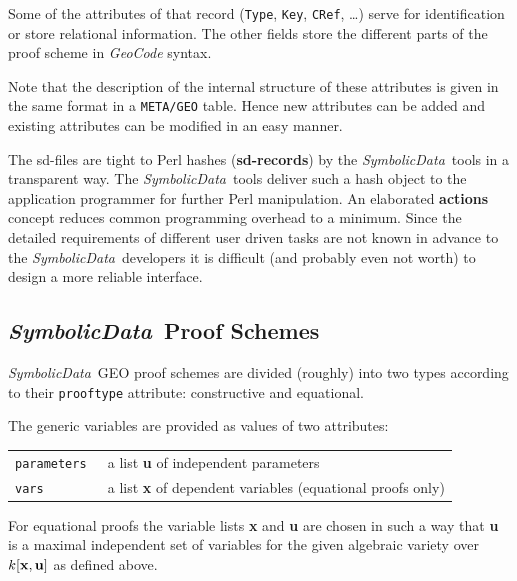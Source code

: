 \documentclass[11pt]{article}
\newcommand{\GC}{\textit{Geo\-Code}}
\newcommand{\SD}{\textit{Symbolic\-Data}}
\begin{document}
Some of the attributes of that record ({\tt Type}, {\tt Key}, {\tt CRef},
\ldots) serve for identification or store relational information. The other
fields store the different parts of the proof scheme in {\GC} syntax.

Note that the description of the internal structure of these attributes is
given in the same format in a {\tt META/GEO} table.  Hence new attributes can
be added and existing attributes can be modified in an easy manner.

The sd-files are tight to Perl hashes ({\bf sd-records}) by the \SD\ tools in
a transparent way.  The \SD\ tools deliver such a hash object to the
application programmer for further Perl manipulation. An elaborated {\bf
  actions} concept reduces common programming overhead to a minimum.  Since
the detailed requirements of different user driven tasks are not known in
advance to the \SD\ developers it is difficult (and probably even not worth)
to design a more reliable interface.

\subsection{\SD\ Proof Schemes}

\SD\ GEO proof schemes are divided (roughly) into two types according to their
{\tt prooftype} attribute: constructive and equational.

The generic variables are provided as values of two attributes:
\begin{center}
\begin{tabular}{lp{12cm}}
\tt parameters & a list {\bf u} of independent parameters\\
\tt vars & a list {\bf x} of dependent variables (equational
proofs only) \\
\end{tabular}
\end{center}
For equational proofs the variable lists {\bf x} and {\bf u} are chosen in
such a way that {\bf u} is a maximal independent set of variables for the
given algebraic variety over $k[{\bf x}, {\bf u}]$ as defined above.
\end{document}
